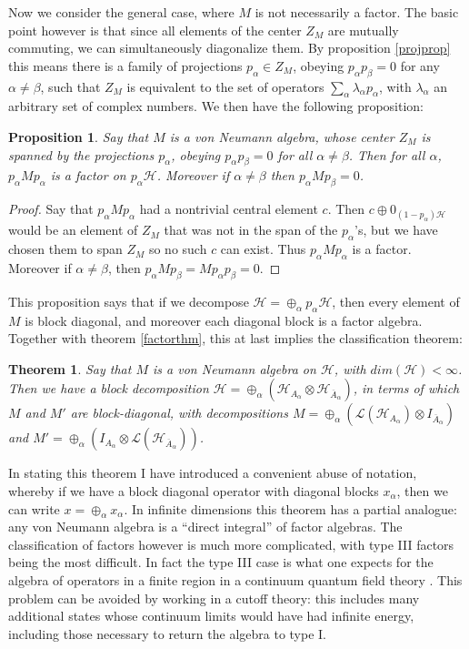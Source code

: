 \documentclass[12pt]{article}
\newcommand{\Ll}{\mathcal{L}}
\newcommand{\Hh}{\mathcal{H}}
\newcommand{\ol}{\overline}
\newtheorem{thm}{Theorem}[section]
\newtheorem{prop}{Proposition}[section]
\begin{document}
Now we consider the general case, where $M$ is not necessarily a factor.  The basic point however is that since all elements of the center $Z_M$ are mutually commuting, we can simultaneously diagonalize them.  By proposition \eqref{projprop} this means there is a family of projections $p_\alpha \in Z_M$, obeying $p_\alpha p_\beta=0$ for any $\alpha\neq \beta$, such that $Z_M$ is equivalent to the set of operators $\sum_\alpha \lambda_{\alpha} p_\alpha$, with $\lambda_\alpha$ an arbitrary set of complex numbers.  We then have the following proposition:
\begin{prop}
Say that $M$ is a von Neumann algebra, whose center $Z_M$ is spanned by the projections $p_\alpha$, obeying $p_\alpha p_\beta=0$ for all $\alpha\neq \beta$.  Then for all $\alpha$, $p_\alpha M p_\alpha$ is a factor on $p_\alpha\Hh$.  Moreover if $\alpha\neq\beta$ then $p_\alpha M p_\beta=0$.
\end{prop}
\begin{proof}
Say that $p_\alpha M p_\alpha$ had a nontrivial central element $c$.  Then $c\oplus 0_{(1-p_\alpha) \Hh}$ would be an element of $Z_M$ that was not in the span of the $p_\alpha$'s, but we have chosen them to span $Z_M$ so no such $c$ can exist.  Thus $p_\alpha M p_\alpha$ is a factor.  Moreover if $\alpha\neq\beta$, then $p_\alpha M p_\beta=Mp_\alpha p_\beta=0$.  
\end{proof}
This proposition says that if we decompose $\Hh=\oplus_\alpha p_\alpha \Hh$, then every element of $M$ is block diagonal, and moreover each diagonal block is a factor algebra.  Together with theorem \eqref{factorthm}, this at last implies the classification theorem:
\begin{thm}\label{classthm}
Say that $M$ is a von Neumann algebra on $\Hh$, with $dim(\Hh)<\infty$. Then we have a block decomposition $\Hh=\oplus_\alpha \left(\mathcal{H}_{A_\alpha}\otimes \mathcal{H}_{\ol{A}_\alpha}\right)$, in terms of which $M$ and $M'$ are block-diagonal, with decompositions $M=\oplus_\alpha\left(\Ll\left(\mathcal{H}_{A_\alpha}\right)\otimes I_{\ol{A}_\alpha}\right)$ and $M'=\oplus_\alpha \left(I_{A_\alpha}\otimes\Ll\left(\mathcal{H}_{\ol{A}_\alpha}\right)\right)$.
\end{thm}
In stating this theorem I have introduced a convenient abuse of notation, whereby if we have a block diagonal operator with diagonal blocks $x_{\alpha}$, then we can write $x=\oplus_\alpha x_\alpha$.  In infinite dimensions this theorem has a partial analogue: any von Neumann algebra is a ``direct integral'' of factor algebras.  The classification of factors however is much more complicated, with type III factors being the most difficult.  In fact the type III case is what one expects for the algebra of operators in a finite region in a continuum quantum field theory \cite{araki1964type,driessler1977type,haag2012local}. This problem can be avoided by working in a cutoff theory: this includes many additional states whose continuum limits would have had infinite energy, including those necessary to return the algebra to type I.    
\end{document}
